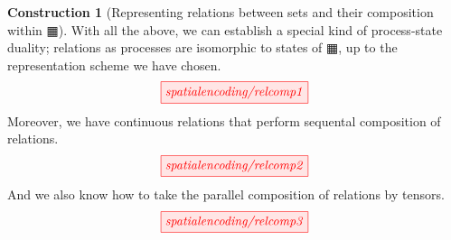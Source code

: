 \documentclass{tufte-handout}
\theoremstyle{definition}
\newtheorem{construction}[theorem]{Construction}
\begin{document}
\begin{fullwidth}
\begin{construction}[Representing relations between sets and their composition within $\squarehvfill$]
With all the above, we can establish a special kind of process-state duality; relations as processes are isomorphic to states of $\squarehvfill$, up to the representation scheme we have chosen.
\[\scalebox{1}{\tikzfig{spatialencoding/relcomp1}}\]
Moreover, we have continuous relations that perform sequental composition of relations.
\[\scalebox{1}{\tikzfig{spatialencoding/relcomp2}}\]
And we also know how to take the parallel composition of relations by tensors.
\[\scalebox{1}{\tikzfig{spatialencoding/relcomp3}}\]
\end{construction}

\end{fullwidth}
\end{document}
